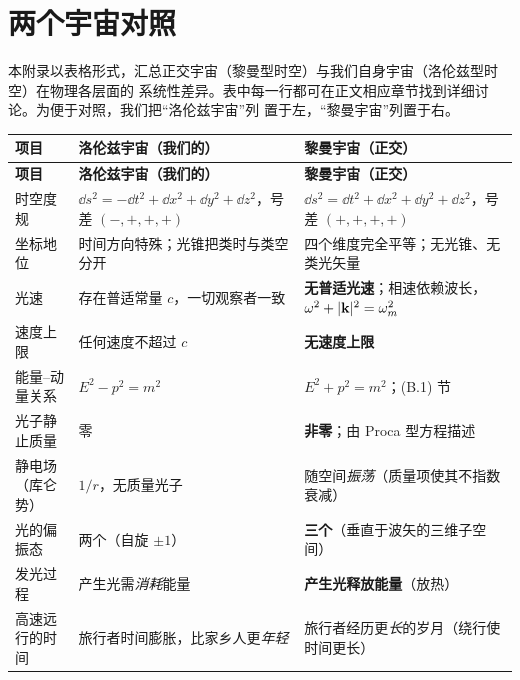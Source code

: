 \chapter{两个宇宙对照}

本附录以表格形式，汇总正交宇宙（黎曼型时空）与我们自身宇宙（洛伦兹型时空）在物理各层面的
系统性差异。表中每一行都可在正文相应章节找到详细讨论。为便于对照，我们把“洛伦兹宇宙”列
置于左，“黎曼宇宙”列置于右。

\begin{longtable}{p{2.9cm} p{5.7cm} p{5.9cm}}
\toprule
\textbf{项目} & \textbf{洛伦兹宇宙（我们的）} & \textbf{黎曼宇宙（正交）} \\
\midrule
\endfirsthead
\toprule
\textbf{项目} & \textbf{洛伦兹宇宙（我们的）} & \textbf{黎曼宇宙（正交）} \\
\midrule
\endhead
\bottomrule
\endlastfoot

时空度规 &
$\dd s^{2}=-\dd t^{2}+\dd x^{2}+\dd y^{2}+\dd z^{2}$，号差 $(-,+,+,+)$ &
$\dd s^{2}=\dd t^{2}+\dd x^{2}+\dd y^{2}+\dd z^{2}$，号差 $(+,+,+,+)$ \\

坐标地位 &
时间方向特殊；光锥把类时与类空分开 &
四个维度完全平等；无光锥、无类光矢量 \\

光速 &
存在普适常量 $c$，一切观察者一致 &
\textbf{无普适光速}；相速依赖波长，$\omega^{2}+|\mathbf{k}|^{2}=\omega_m^{2}$ \\

速度上限 &
任何速度不超过 $c$ &
\textbf{无速度上限} \\

能量--动量关系 &
$E^{2}-p^{2}=m^{2}$ &
$E^{2}+p^{2}=m^{2}$；(B.1) 节 \\

光子静止质量 &
零 &
\textbf{非零}；由 Proca 型方程描述 \\

静电场（库仑势） &
$1/r$，无质量光子 &
随空间\emph{振荡}（质量项使其不指数衰减） \\

光的偏振态 &
两个（自旋 $\pm1$） &
\textbf{三个}（垂直于波矢的三维子空间） \\

发光过程 &
产生光需\emph{消耗}能量 &
\textbf{产生光释放能量}（放热） \\

高速远行的时间 &
旅行者时间膨胀，比家乡人更\emph{年轻} &
旅行者经历更\emph{长}的岁月（绕行使时间更长） \\


\end{longtable}
